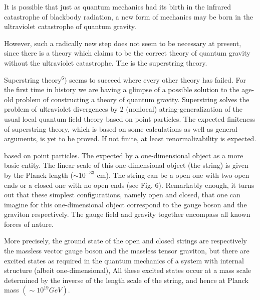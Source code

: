 It is possible that just as quantum mechanics had its birth in the infrared catastrophe
of blackbody radiation, a new form of mechanics may be born in the ultraviolet catastrophe
of quantum gravity.

However, such a radically new step does not seem to be necessary at present, since there is a theory which claims to be the correct theory of quantum gravity without the ultraviolet catastrophe. The is the superstring theory.

Superstring theory$^{6}$) seems to succeed where every other theory has failed. For the
first time in history we are having a glimpse of a possible solution to the age-old problem of constructing a theory of quantum gravity. Superstring solves the problem of ultraviolet divergences by 2 (nonlocal) atring-generalization of the usual local quantum field theory based on point particles. The expected finiteness of superstring theory, which is based on some calculations as well as general arguments, is yet to be proved. If not finite, at least renormalizability is expected.

based on point particles. The expected by a one-dimensional object as a more basic entity. The  linear scale of this one-dimensional object (the string) is given by the Planck length ($\sim 10^{-33}$ cm). The string can be a open one with two open ends or a closed one with no open ends (see Fig. 6). Remarkably enough, it turns out that these simplest configurations, namely open and closed, that one can imagine for this one-dimensional object correspond to the gauge boson and the graviton respectively. The gauge field and gravity together encompass all known forces of nature.

More precisely, the ground state of the open and closed strings are respectively the massless vector gauge boson and the massless tensor graviton, but there are excited states as required in the quantum mechanics of a system with internal structure (albeit one-dimensional), All these excited states occur at a mass scale determined by the inverse of the length scale of the string, and hence at Planck mass $(\sim 10^{19} GeV)$.

